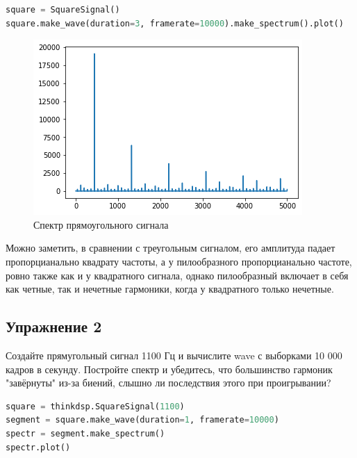 \begin{lstlisting}[language=Python]
square = SquareSignal()
square.make_wave(duration=3, framerate=10000).make_spectrum().plot()
\end{lstlisting}

\begin{figure}[H]
	\begin{center}
		\includegraphics[scale=1]{fig/lab02/lab02_4.png}
		\caption{Спектр прямоугольного сигнала}
	\end{center}
\end{figure}

Можно заметить, в сравнении с треугольным сигналом, его амплитуда падает пропорцианально квадрату частоты, а у пилообразного пропорцианально частоте, ровно также как и у квадратного сигнала, однако пилообразный включает в себя как четные, так и нечетные гармоники, когда у квадратного только нечетные.

\subsection{Упражнение 2}

Создайте прямугольный сигнал 1100 Гц и вычислите wave с выборками 10 000 кадров в секунду. Постройте спектр и убедитесь, что большинство гармоник "завёрнуты" из-за биений, слышно ли последствия этого при проигрывании?

\begin{lstlisting}[language=Python]
square = thinkdsp.SquareSignal(1100)
segment = square.make_wave(duration=1, framerate=10000)
spectr = segment.make_spectrum()
spectr.plot()
\end{lstlisting}

